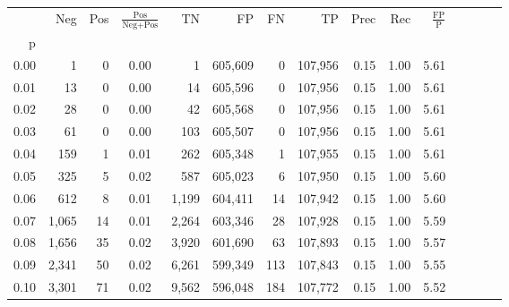 \begin{tabular}{rrrcrrrrrrrrrrr}
\toprule
{} &     Neg &    Pos & $\frac{\text{Pos}}{\text{Neg}+\text{Pos}}$ &       TN &       FP &       FN &       TP &  Prec &   Rec & $\frac{\text{FP}}{\text{P}}$ \\
p    &         &        &                                            &          &          &          &          &       &       &                              \\
\midrule
0.00 &       1 &      0 &                                       0.00 &        1 &  605,609 &        0 &  107,956 &  0.15 &  1.00 &                         5.61 \\
0.01 &      13 &      0 &                                       0.00 &       14 &  605,596 &        0 &  107,956 &  0.15 &  1.00 &                         5.61 \\
0.02 &      28 &      0 &                                       0.00 &       42 &  605,568 &        0 &  107,956 &  0.15 &  1.00 &                         5.61 \\
0.03 &      61 &      0 &                                       0.00 &      103 &  605,507 &        0 &  107,956 &  0.15 &  1.00 &                         5.61 \\
0.04 &     159 &      1 &                                       0.01 &      262 &  605,348 &        1 &  107,955 &  0.15 &  1.00 &                         5.61 \\
0.05 &     325 &      5 &                                       0.02 &      587 &  605,023 &        6 &  107,950 &  0.15 &  1.00 &                         5.60 \\
0.06 &     612 &      8 &                                       0.01 &    1,199 &  604,411 &       14 &  107,942 &  0.15 &  1.00 &                         5.60 \\
0.07 &   1,065 &     14 &                                       0.01 &    2,264 &  603,346 &       28 &  107,928 &  0.15 &  1.00 &                         5.59 \\
0.08 &   1,656 &     35 &                                       0.02 &    3,920 &  601,690 &       63 &  107,893 &  0.15 &  1.00 &                         5.57 \\
0.09 &   2,341 &     50 &                                       0.02 &    6,261 &  599,349 &      113 &  107,843 &  0.15 &  1.00 &                         5.55 \\
0.10 &   3,301 &     71 &                                       0.02 &    9,562 &  596,048 &      184 &  107,772 &  0.15 &  1.00 &                         5.52 \\

\end{tabular}
